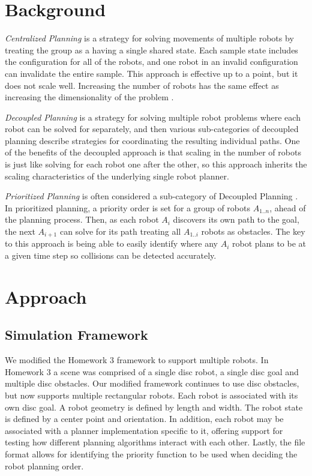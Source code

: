 \documentclass[12pt,journal,compsoc]{IEEEtran}
\begin{document}
\section{Background}
\emph{Centralized Planning} is a strategy for solving movements of multiple robots by treating the group as a having a single shared state. Each sample state includes the configuration for all of the robots, and one robot in an invalid configuration can invalidate the entire sample. This approach is effective up to a point, but it does not scale well. Increasing the number of robots has the same effect as increasing the dimensionality of the problem \cite{lavalle}.
\par
\emph{Decoupled Planning} is a strategy for solving multiple robot problems where each robot can be solved for separately, and then various sub-categories of decoupled planning describe strategies for coordinating the resulting individual paths. One of the benefits of the decoupled approach is that scaling in the number of robots is just like solving for each robot one after the other, so this approach inherits the scaling characteristics of the underlying single robot planner. 
\par
\emph{Prioritized Planning} is often considered a sub-category of Decoupled Planning \cite{lavalle}. In prioritized planning, a priority order is set for a group of robots ${A_{1..n}}$, ahead of the planning process. Then, as each robot ${A_{i}}$ discovers its own path to the goal, the next ${A_{i+1}}$ can solve for its path treating all ${A_{1..i}}$ robots as obstacles. The key to this approach is being able to easily identify where any ${A_{i}}$ robot plans to be at a given time step so collisions can be detected accurately.

\section{Approach}
\subsection{Simulation Framework}
We modified the Homework 3 framework to support multiple robots. In Homework 3 a scene was comprised of a single disc robot, a single disc goal and multiple disc obstacles. Our modified framework continues to use disc obstacles, but now supports multiple rectangular robots. Each robot is associated with its own disc goal. A robot geometry is defined by length and width. The robot state is defined by a center point and orientation. In addition, each robot may be associated with a planner implementation specific to it,  offering support for testing how different planning algorithms interact with each other. Lastly, the file format allows for identifying the priority function to be used when deciding the robot planning order.
\end{document}
